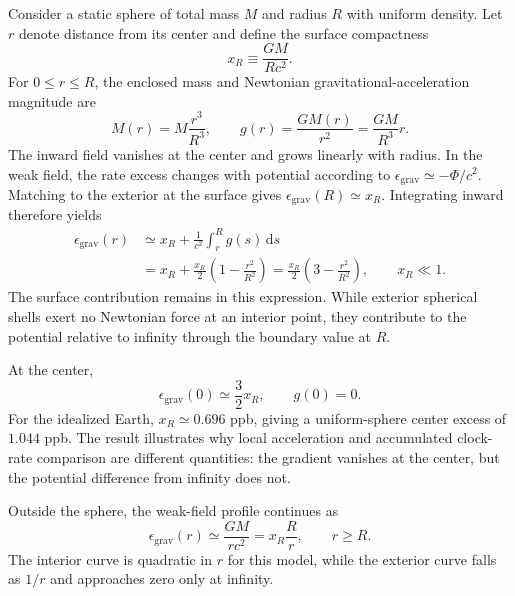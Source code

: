 \documentclass[12pt]{article}
\begin{document}
Consider a static sphere of total mass $M$ and radius $R$ with uniform density. Let $r$ denote distance from its center and define the surface compactness
\begin{equation}
  x_R\equiv\frac{GM}{Rc^2}.
  \label{eq:surface-compactness}
\end{equation}
For $0\leq r\leq R$, the enclosed mass and Newtonian gravitational-acceleration magnitude are
\begin{equation}
  M(r)=M\frac{r^3}{R^3},
  \qquad
  g(r)=\frac{GM(r)}{r^2}=\frac{GM}{R^3}r.
  \label{eq:uniform-g}
\end{equation}
The inward field vanishes at the center and grows linearly with radius. In the weak field, the rate excess changes with potential according to $\epsilon_{\mathrm{grav}}\simeq-\Phi/c^2$. Matching to the exterior at the surface gives $\epsilon_{\mathrm{grav}}(R)\simeq x_R$. Integrating inward therefore yields
\begin{align}
  \epsilon_{\mathrm{grav}}(r)
  &\simeq x_R+\frac{1}{c^2}\int_r^R g(s)\,\mathrm{d}s \\
  &=x_R+\frac{x_R}{2}\left(1-\frac{r^2}{R^2}\right)
   =\frac{x_R}{2}\left(3-\frac{r^2}{R^2}\right),
  \qquad x_R\ll1.
  \label{eq:uniform-depth}
\end{align}
The surface contribution remains in this expression. While exterior spherical shells exert no Newtonian force at an interior point, they contribute to the potential relative to infinity through the boundary value at $R$.

At the center,
\begin{equation}
  \epsilon_{\mathrm{grav}}(0)\simeq\frac{3}{2}x_R,
  \qquad
  g(0)=0.
  \label{eq:uniform-center}
\end{equation}
For the idealized Earth, $x_R\simeq0.696$ ppb, giving a uniform-sphere center excess of $1.044$ ppb. The result illustrates why local acceleration and accumulated clock-rate comparison are different quantities: the gradient vanishes at the center, but the potential difference from infinity does not.

Outside the sphere, the weak-field profile continues as
\begin{equation}
  \epsilon_{\mathrm{grav}}(r)\simeq\frac{GM}{rc^2}
  =x_R\frac{R}{r},
  \qquad r\geq R.
  \label{eq:exterior-profile}
\end{equation}
The interior curve is quadratic in $r$ for this model, while the exterior curve falls as $1/r$ and approaches zero only at infinity.
\end{document}
